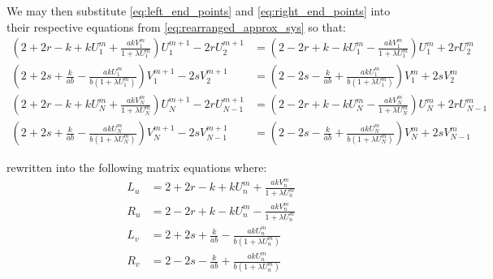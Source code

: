We may then substitute \eqref{eq:left_end_points} and
\eqref{eq:right_end_points} into their respective equations from
\eqref{eq:rearranged_approx_sys} so that:
\begin{subequations} \label{eq:rearranged_approx_sys_endpoints}
\begin{align}
    \left(
        2 + 2r - k + k U_1^m + \frac{a k V_1^m}{1 + \lambda U_1^m}
    \right)
    U_{1}^{m+1} - 2r U_{2}^{m+1} &=
    \left(
        2 - 2r + k - k U_1^m - \frac{a k V_1^m}{1 + \lambda U_1^m}
    \right)
    U_{1}^{m} + 2r U_{2}^{m}
    \\
    \left(
        2 + 2s + \frac{k}{ab} - \frac{a k U_1^m}{b ( 1 + \lambda U_1^m )}
    \right)
    V_{1}^{m+1} - 2s V_{2}^{m+1} &=
    \left(
        2 - 2s - \frac{k}{ab} + \frac{a k U_1^m}{b ( 1 + \lambda U_1^m )}
    \right)
    V_{1}^{m} + 2s V_{2}^{m}
    \\
    \left(
        2 + 2r - k + k U_N^m + \frac{a k V_N^m}{1 + \lambda U_N^m}
    \right)
    U_{N}^{m+1} - 2r U_{N-1}^{m+1} &=
    \left(
        2 - 2r + k - k U_N^m - \frac{a k V_N^m}{1 + \lambda U_N^m}
    \right)
    U_{N}^{m} + 2r U_{N-1}^{m}
    \\
    \left(
        2 + 2s + \frac{k}{ab} - \frac{a k U_N^m}{b ( 1 + \lambda U_N^m )}
    \right)
    V_{N}^{m+1} - 2s V_{N-1}^{m+1} &=
    \left(
        2 - 2s - \frac{k}{ab} + \frac{a k U_N^m}{b ( 1 + \lambda U_N^m )}
    \right)
    V_{N}^{m} + 2s V_{N-1}^{m}
\end{align}
\end{subequations}

rewritten into the following matrix equations where:
\begin{subequations}
\begin{align*}
    L_u &= 2 + 2r - k + k U_n^m + \frac{a k V_n^m}{1 + \lambda U_n^m} \\
    R_u &= 2 - 2r + k - k U_n^m - \frac{a k V_n^m}{1 + \lambda U_n^m} \\
    L_v &= 2 + 2s + \frac{k}{ab} - \frac{a k U_n^m}{b ( 1 + \lambda U_n^m )} \\
    R_v &= 2 - 2s - \frac{k}{ab} + \frac{a k U_n^m}{b ( 1 + \lambda U_n^m )}
\end{align*}
\end{subequations}


